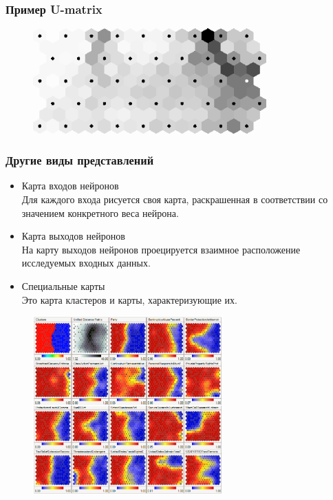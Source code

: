 \documentclass[aspectratio=169]{beamer}
\begin{document}
\begin{frame}
  \frametitle{Пример U-matrix}
  \begin{figure}
    \centering
    \includegraphics[width=0.8\textwidth]{u-matrix.png}
  \end{figure}
\end{frame}

\begin{frame}
  \frametitle{Другие виды представлений}
  \begin{itemize}
    \item Карта входов нейронов \\
    Для каждого входа рисуется своя карта, раскрашенная в соответствии со
    значением конкретного веса нейрона.
    \item Карта выходов нейронов \\
    На карту выходов нейронов проецируется взаимное расположение исследуемых
    входных данных.
    \item Специальные карты \\
    Это карта кластеров и карты, характеризующие их.
  \end{itemize}
\end{frame}

\begin{frame}
  \begin{figure}
    \centering
    \includegraphics[width=0.65\textwidth]{congress.png}
  \end{figure}
\end{frame}
\end{document}
